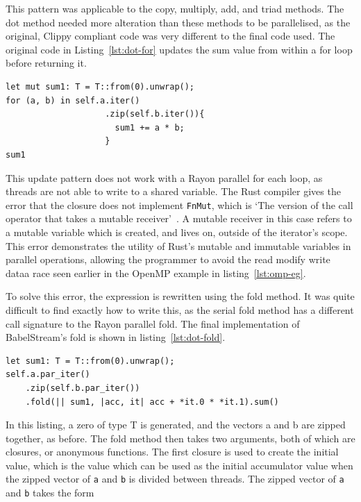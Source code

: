 This pattern was applicable to the copy, multiply, add, and triad methods. The dot method needed more alteration than these methods to be parallelised, as the original, Clippy compliant code was very different to the final code used. The original code in Listing~\ref{lst:dot-for} updates the sum value from within a for loop before returning it.
\begin{code}
\begin{verbatim}
let mut sum1: T = T::from(0).unwrap();
for (a, b) in self.a.iter()
                    .zip(self.b.iter()){
                      sum1 += a * b;
                    }
sum1
\end{verbatim}
\label{lst:dot-for}
\end{code}
This update pattern does not work with a Rayon parallel for each loop, as threads are not able to write to a shared variable. The Rust compiler gives the error that the closure does not implement \texttt{FnMut}, which is `The version of the call operator that takes a mutable receiver'~\cite{rust-doc-fnmut}. A mutable receiver in this case refers to a mutable variable which is created, and lives on, outside of the iterator's scope. This error demonstrates the utility of Rust's mutable and immutable variables in parallel operations, allowing the programmer to avoid the read modify write dataa race seen earlier in the OpenMP example in listing~\ref{lst:omp-eg}.

To solve this error, the expression is rewritten using the fold method. It was quite difficult to find exactly how to write this, as the serial fold method has a different call signature to the Rayon parallel fold. The final implementation of BabelStream's fold is shown in listing~\ref{lst:dot-fold}.
\begin{code}
\begin{verbatim}
let sum1: T = T::from(0).unwrap();
self.a.par_iter()
    .zip(self.b.par_iter())
    .fold(|| sum1, |acc, it| acc + *it.0 * *it.1).sum()
\end{verbatim}
\label{lst:dot-fold}
\end{code}
In this listing, a zero of type T is generated, and the vectors a and b are zipped together, as before. The fold method then takes two arguments, both of which are closures, or anonymous functions. The first closure is used to create the initial value, which is the value which can be used as the initial accumulator value when the zipped vector of \texttt{a} and \texttt{b} is divided between threads. The zipped vector of \texttt{a} and \texttt{b} takes the form

